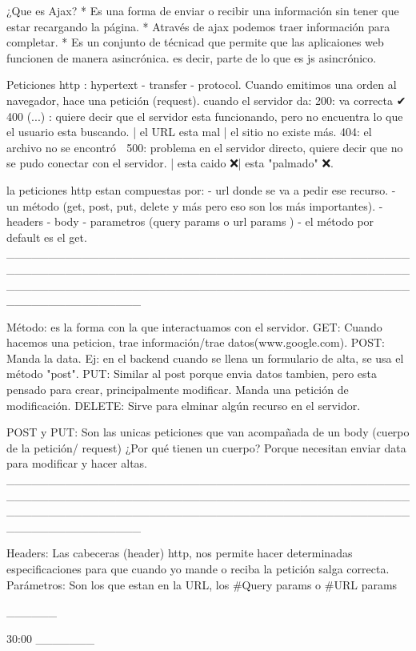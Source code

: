 ¿Que es Ajax?
* Es una forma de enviar o recibir una información sin tener que estar recargando la página.
* Através de ajax podemos traer información para completar.
* Es un conjunto de técnicad  que permite que las aplicaiones web funcionen de manera asincrónica. es decir, parte de lo que es js asincrónico.

Peticiones http : hypertext - transfer - protocol. 
Cuando emitimos una orden al navegador, hace una petición (request).
cuando el servidor da:
200: va correcta ✔
400 (...) : quiere decir que el servidor esta funcionando, pero no encuentra lo que el usuario esta buscando. | el URL esta mal | el sitio no existe más.
404: el archivo no se encontró 🤔
500: problema en el servidor directo, quiere decir que no se pudo conectar con el servidor. | esta caido ❌| esta "palmado" ❌.

la peticiones http estan compuestas por:
- url donde se va a pedir ese recurso. 
- un método (get, post, put, delete y más pero eso son los más importantes).
- headers
- body
- parametros (query params o url params )
- el método por default es el get.
________________________________________________________________________________________________________________________________________________________________

Método: es la forma con la que interactuamos con el servidor.
GET: Cuando hacemos una peticion, trae información/trae datos(www.google.com).
POST: Manda la data. Ej: en el backend cuando se llena un formulario de alta, se usa el método "post".  
PUT: Similar al post porque envia datos tambien, pero esta pensado para crear, principalmente modificar. Manda una petición de modificación.
DELETE: Sirve para elminar algún recurso en el servidor.

POST y PUT: 
Son las unicas peticiones que van acompañada de un body (cuerpo de la petición/ request)
¿Por qué tienen un cuerpo?
Porque necesitan enviar data para modificar y hacer altas.
________________________________________________________________________________________________________________________________________________________________

Headers: Las cabeceras (header) http, nos permite hacer determinadas especificaciones para que cuando yo mande o reciba la petición salga correcta.
Parámetros: Son los que estan en la URL, los  #Query params o #URL params               
    
    
                                                                            ______

                                                                            30:00
                                                                            _______

